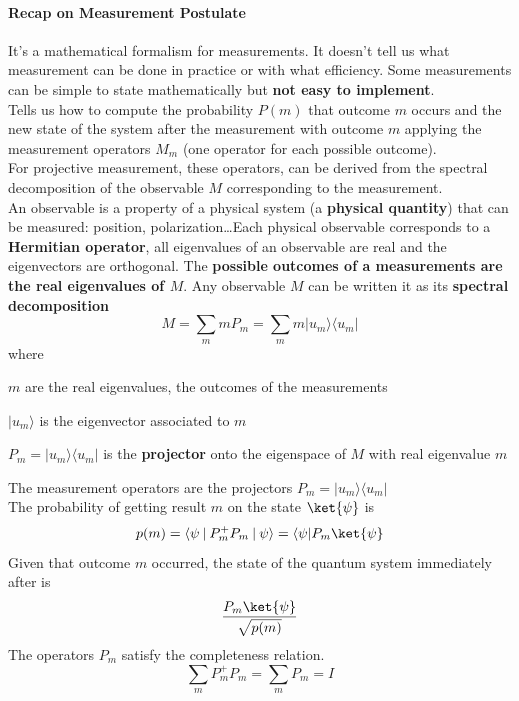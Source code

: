 \documentclass[10pt]{report}
\begin{document}
\paragraph{Recap on Measurement Postulate} It's a mathematical formalism for measurements. It doesn't tell us what measurement can be done in practice or with what efficiency. Some measurements can be simple to state mathematically but \textbf{not easy to implement}.\\
Tells us how to compute the probability $P(m)$ that outcome $m$ occurs and the new state of the system after the measurement with outcome $m$ applying the measurement operators $M_m$ (one operator for each possible outcome).\\
For projective measurement, these operators, can be derived from the spectral decomposition of the observable $M$ corresponding to the measurement.\\
An observable is a property of a physical system (a \textbf{physical quantity}) that can be measured: position, polarization\ldots Each physical observable corresponds to a \textbf{Hermitian operator}, all eigenvalues of an observable are real and the eigenvectors are orthogonal. The \textbf{possible outcomes of a measurements are the real eigenvalues of $M$}.
Any observable $M$ can be written it as its \textbf{spectral decomposition} $$M = \sum_m mP_m = \sum_m m|u_m\rangle\langle u_m|$$
where \begin{list}{}{}
	\item $m$ are the real eigenvalues, the outcomes of the measurements
	\item $|u_m\rangle$ is the eigenvector associated to $m$
	\item $P_m = |u_m\rangle\langle u_m|$ is the \textbf{projector} onto the eigenspace of $M$ with real eigenvalue $m$
\end{list}
The measurement operators are the projectors $P_m = |u_m\rangle\langle u_m|$\\
The probability of getting result $m$ on the state $\ket{\psi}$ is $$p(m) = \langle\psi\:|\:P_m^+ P_m\:|\:\psi\rangle = \langle\psi|P_m\ket{\psi} $$
Given that outcome $m$ occurred, the state of the quantum system immediately after is $$\frac{P_m\ket{\psi}}{\sqrt{p(m)}}$$
The operators $P_m$ satisfy the completeness relation.
$$\sum_m P_m^+P_m = \sum_m P_m = I$$
\end{document}

